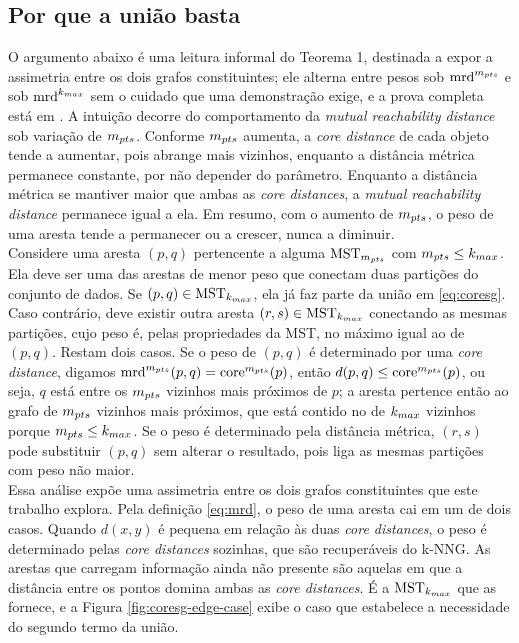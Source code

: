 \subsection{Por que a união basta\label{sec:coresg-why}}

O argumento abaixo é uma leitura informal do Teorema 1, destinada a expor a assimetria entre os dois grafos constituintes; ele alterna entre pesos sob $\mathrm{mrd}^{m_{pts}}$ e sob $\mathrm{mrd}^{k_{max}}$ sem o cuidado que uma demonstração exige, e a prova completa está em . A intuição decorre do comportamento da \textit{mutual reachability distance} sob variação de $m_{pts}$. Conforme $m_{pts}$ aumenta, a \textit{core distance} de cada objeto tende a aumentar, pois abrange mais vizinhos, enquanto a distância métrica permanece constante, por não depender do parâmetro. Enquanto a distância métrica se mantiver maior que ambas as \textit{core distances}, a \textit{mutual reachability distance} permanece igual a ela. Em resumo, com o aumento de $m_{pts}$, o peso de uma aresta tende a permanecer ou a crescer, nunca a diminuir.\\

Considere uma aresta $(p,q)$ pertencente a alguma $\mathrm{MST}_{m_{pts}}$ com $m_{pts} \leq k_{max}$. Ela deve ser uma das arestas de menor peso que conectam duas partições do conjunto de dados. Se $(p,q) \in \mathrm{MST}_{k_{max}}$, ela já faz parte da união em \eqref{eq:coresg}. Caso contrário, deve existir outra aresta $(r,s) \in \mathrm{MST}_{k_{max}}$ conectando as mesmas partições, cujo peso é, pelas propriedades da \ac{MST}, no máximo igual ao de $(p,q)$. Restam dois casos. Se o peso de $(p,q)$ é determinado por uma \textit{core distance}, digamos $\mathrm{mrd}^{m_{pts}}(p,q) = \mathrm{core}^{m_{pts}}(p)$, então $d(p,q) \leq \mathrm{core}^{m_{pts}}(p)$, ou seja, $q$ está entre os $m_{pts}$ vizinhos mais próximos de $p$; a aresta pertence então ao grafo de $m_{pts}$ vizinhos mais próximos, que está contido no de $k_{max}$ vizinhos porque $m_{pts} \leq k_{max}$. Se o peso é determinado pela distância métrica, $(r,s)$ pode substituir $(p,q)$ sem alterar o resultado, pois liga as mesmas partições com peso não maior.\\

Essa análise expõe uma assimetria entre os dois grafos constituintes que este trabalho explora. Pela definição \eqref{eq:mrd}, o peso de uma aresta cai em um de dois casos. Quando $d(x,y)$ é pequena em relação às duas \textit{core distances}, o peso é determinado pelas \textit{core distances} sozinhas, que são recuperáveis do \ac{k-NNG}. As arestas que carregam informação ainda não presente são aquelas em que a distância entre os pontos domina ambas as \textit{core distances}. É a $\mathrm{MST}_{k_{max}}$ que as fornece, e a Figura \ref{fig:coresg-edge-case} exibe o caso que estabelece a necessidade do segundo termo da união.\\


